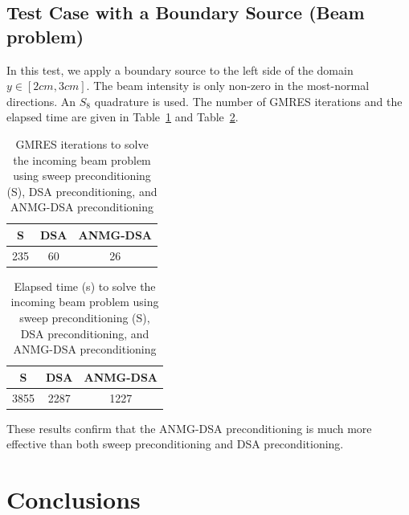 \documentclass[preprint,10pt]{elsarticle}
\renewcommand{\(}{\left(}
\renewcommand{\)}{\right)}
\renewcommand{\[}{\left[}
\renewcommand{\]}{\right]}
\newcommand{\tbl}[1]{Table~\ref{#1}}                     %
\begin{document}
\subsection{Test Case with a Boundary Source (Beam problem)}

In this test, we apply a boundary source to the left side of the domain $y\in [2cm,3cm]$.
The beam intensity is only non-zero in the most-normal directions. An $S_8$ quadrature is used.
The number of GMRES iterations and the elapsed time are given in \tbl{tab:4} and \tbl{tab:5}.
%
\begin{table}[H]
\begin{center}
\begin{tabular}{|c||c||c|}
\hline
S & DSA & ANMG-DSA\\
\hline
235 & 60 & 26 \\
\hline
\end{tabular}
\caption{GMRES iterations to solve the incoming beam problem using sweep preconditioning (S), DSA preconditioning, and ANMG-DSA preconditioning}
\label{tab:4}
\end{center}
\end{table}

\begin{table}[H]
\begin{center}
\begin{tabular}{|c||c||c|}
\hline
S & DSA & ANMG-DSA\\
\hline
3855 & 2287 & 1227\\
\hline
\end{tabular}
\caption{Elapsed time (s) to solve the  incoming beam problem using sweep preconditioning (S), DSA preconditioning, and ANMG-DSA preconditioning}
\label{tab:5}
\end{center}
\end{table}
%
These results confirm that the ANMG-DSA preconditioning is much more effective than both sweep 
preconditioning and DSA preconditioning.

\section{Conclusions} \label{sec:conclusions}
\end{document}
